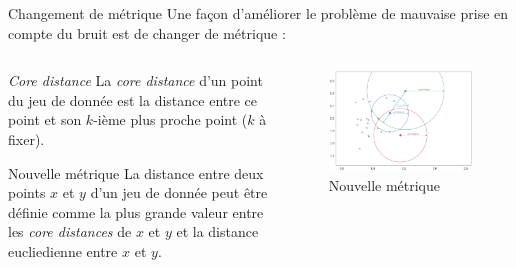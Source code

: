 \begin{frame}{Changement de métrique}
    Une façon d'améliorer le problème de mauvaise prise en compte du bruit est de changer de métrique :
    \begin{columns}
        \begin{column}{0.55\textwidth}
            \begin{block}{\emph{Core distance}}
                La \emph{core distance} d'un point du jeu de donnée est la distance entre ce point et son $k$-ième plus proche point ($k$ à fixer).
            \end{block}
        
            \begin{block}{Nouvelle métrique}
                La distance entre deux points $x$ et $y$ d'un jeu de donnée peut être définie comme la plus grande valeur entre les \emph{core distances} de $x$ et $y$ et la distance eucliedienne entre $x$ et $y$.
            \end{block}
        \end{column}
        \begin{column}{0.4\textwidth}
            \begin{figure}
                \includegraphics[width=0.6\paperheight]{images/metrique.png}
                \caption{\label{fig:metrique}Nouvelle métrique}
            \end{figure}
        \end{column}
    \end{columns}
\end{frame}

